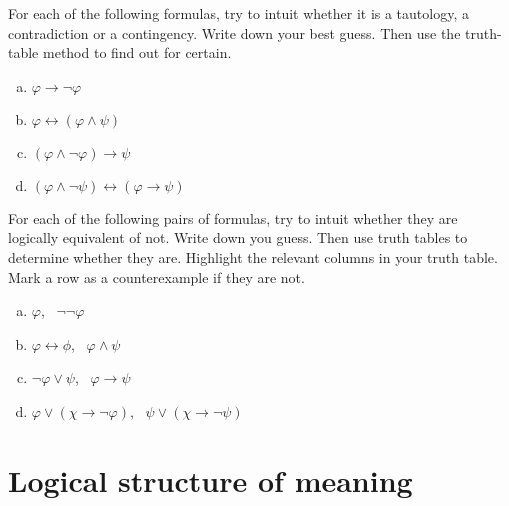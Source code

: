 \documentclass[nobib,nofonts]{tufte-handout}
\begin{document}
\bigskip
\noindent \colorbox{mygray}{\centering
  \begin{minipage}{1.0\textwidth}

    \begin{exercise}
      For each of the following formulas, try to intuit whether it is a tautology, a contradiction or a contingency. Write down your best guess. Then use the truth-table method to find out for certain.
      \begin{multicols}{2}
        \begin{enumerate}[a.]
          \item $\varphi \rightarrow \neg \varphi$
          \item $\varphi \leftrightarrow (\varphi \wedge \psi)$
          \item $(\varphi \wedge \neg \varphi) \rightarrow \psi$
          \item $(\varphi \wedge \neg \psi) \leftrightarrow (\varphi \rightarrow \psi)$
        \end{enumerate}
      \end{multicols}
    \end{exercise}

    \begin{exercise}
      For each of the following pairs of formulas, try to intuit whether they are logically equivalent of not. Write down you guess. Then use truth tables to determine whether they are. Highlight the relevant columns in your truth table. Mark a row as a counterexample if they are not.
      \begin{multicols}{2}
        \begin{enumerate}[a.]
          \item $\varphi$, \ $\neg \neg \varphi$
          \item $\varphi \leftrightarrow \phi$, \ $\varphi \wedge \psi$
          \item $\neg \varphi \vee  \psi$, \  $\varphi \rightarrow \psi$
          \item $\varphi \vee (\chi \rightarrow \neg \varphi)$, \ $\psi \vee (\chi \rightarrow \neg \psi)$
        \end{enumerate}
      \end{multicols}
    \end{exercise}

  \end{minipage}
}

\newpage

\section{Logical structure of meaning}
\label{sec:excav-prop-logic}
\end{document}
